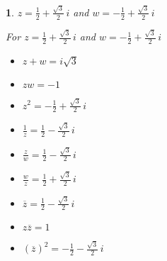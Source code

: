 \documentclass{amsbook}
\newtheorem{exc}{}
\newenvironment{ex}{\begin{exc}\normalfont}{\end{exc}}
\numberwithin{section}{chapter}
\numberwithin{equation}{chapter}
\begin{document}
\begin{ex}
	 $z = \frac{1}{2} + \frac{\sqrt{3}}{2} \, i$ and $w = -\frac{1}{2} + \frac{\sqrt{3}}{2} \,i$

	\begin{sol}
		For   $z = \frac{1}{2} + \frac{\sqrt{3}}{2} \, i$ and $w = -\frac{1}{2} + \frac{\sqrt{3}}{2} \,i$
		
		\begin{multicols}{3}
			
			\begin{itemize}
				
				\item $z+w = i\sqrt{3}$
				
				\item $zw = -1$
				
				\item $z^2 = -\frac{1}{2} + \frac{\sqrt{3}}{2} \,i$
				
			\end{itemize}
			
		\end{multicols}
		
		\begin{multicols}{3}
			
			\begin{itemize}
				
				\item $\frac{1}{z} = \frac{1}{2} - \frac{\sqrt{3}}{2} \, i$
				
				\item $\frac{z}{w} = \frac{1}{2} - \frac{\sqrt{3}}{2} \, i$
				
				\item $\frac{w}{z} = \frac{1}{2} + \frac{\sqrt{3}}{2} \, i$
				
			\end{itemize}
			
		\end{multicols}
		
		\begin{multicols}{3}
			
			\begin{itemize}
				
				\item $\overline{z} = \frac{1}{2} - \frac{\sqrt{3}}{2} \, i$
				
				\item $z\overline{z} = 1$
				
				\item $(\overline{z})^2 = -\frac{1}{2} - \frac{\sqrt{3}}{2} \, i$
				
			\end{itemize}
			
		\end{multicols}
	\end{sol}
\end{ex}
\end{document}
